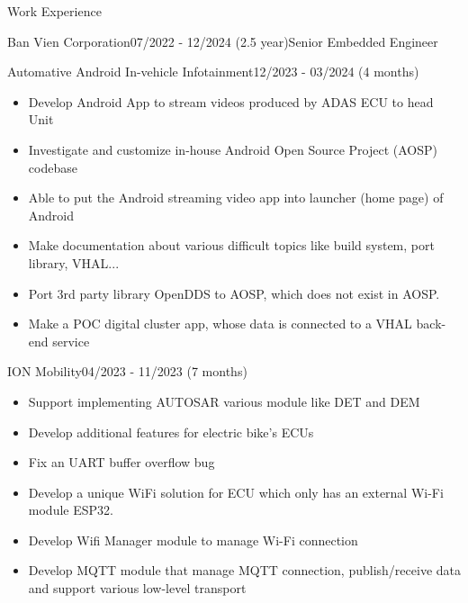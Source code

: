 \documentclass{resume} %
\begin{document}
\begin{rSection}{Work Experience}
\begin{rCompanySubsection}{Ban Vien Corporation}{07/2022 - 12/2024 (2.5 year)}{Senior Embedded Engineer}{}
{        %
        \begin{rProjectSubsubsectionV2}{Automative Android In-vehicle Infotainment}{12/2023 - 03/2024 (4 months)}{
            \begin{itemize}
                \item Develop Android App to stream videos produced by ADAS ECU to head Unit
                \item Investigate and customize in-house Android Open Source Project (AOSP) codebase
            \end{itemize}
        }{
            \begin{itemize}
                \item Able to put the Android streaming video app into launcher (home page) of Android
                \item Make documentation about various difficult topics like build system, port library, VHAL...
                \item Port 3rd party library OpenDDS to AOSP, which does not exist in AOSP.
                \item Make a POC digital cluster app, whose data is connected to a VHAL back-end service
            \end{itemize}
        }
        \end{rProjectSubsubsectionV2}

        \begin{rProjectSubsubsectionV2}{ION Mobility}{04/2023 - 11/2023 (7 months)}{
            \begin{itemize}
                \item Support implementing AUTOSAR various module like DET and DEM
                \item Develop additional features for electric bike's ECUs
            \end{itemize}
        }{
            \begin{itemize}
                \item Fix an UART buffer overflow bug
                \item Develop a unique WiFi solution for ECU which only has an external Wi-Fi module ESP32.
                \item Develop Wifi Manager module to manage Wi-Fi connection
                \item Develop MQTT module that manage MQTT connection, publish/receive data and support various low-level transport
            \end{itemize}
        }
        \end{rProjectSubsubsectionV2}

}
\end{rCompanySubsection}
\end{rSection}
\end{document}
